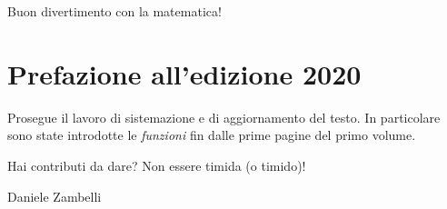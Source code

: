 Buon divertimento con la matematica!

\section{Prefazione all'edizione 2020}
Prosegue il lavoro di sistemazione e di aggiornamento del testo.
In particolare sono state introdotte le \emph{funzioni} fin dalle prime 
pagine del primo volume.

Hai contributi da dare? Non essere timida (o timido)!
\begin{flushright}
Daniele Zambelli
\end{flushright}

